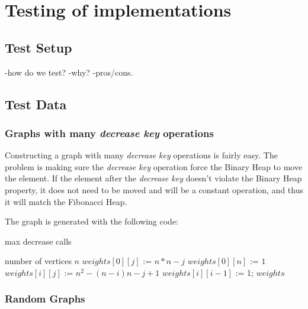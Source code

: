 \section*{Testing of implementations}
\subsection*{Test Setup}
 -how do we test?
 -why?
 -pros/cons.

\subsection*{Test Data}
  \subsubsection*{Graphs with many \textit{decrease key} operations} 
    Constructing a graph with many \textit{decrease key} operations is fairly easy. The problem is making sure the \textit{decrease key} operation force the Binary Heap to move the element. If the element after the \textit{decrease key} doesn't violate the Binary Heap property, it does not need to be moved and will be a constant operation, and thus it will match the Fibonacci Heap.

    The graph is generated with the following code:
    \begin{algorithm}
      \caption{ max decrease calls}
      \begin{algorithmic}[1]
	\REQUIRE number of vertices $n$
	    \STATE $weights[0][j]$ := $n*n -j$
	  \ENDFOR
	  \STATE $weights[0][n]$ := $1$
	      \STATE $weights[i][j]$ := $n^2 - (n - i)n - j + 1$
	    \ENDFOR
	    \STATE $weights[i][i-1]$ := 1;
	  \ENDFOR
	\RETURN $weights$
\end{algorithmic}
\end{algorithm}
 \subsubsection*{Random Graphs}
